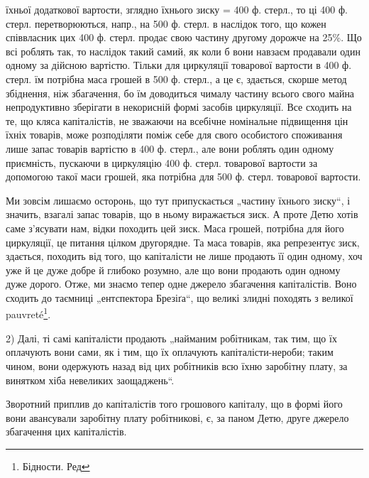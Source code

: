\parcont{}  %
їхньої додаткової вартости, зглядно їхнього зиску = 400 ф. стерл., то
ці 400 ф. стерл. перетворюються, напр., на 500 ф. стерл. в наслідок
того, що кожен співвласник цих 400 ф. стерл. продає свою частину другому
дорожче на 25\%. Що всі роблять так, то наслідок такий самий,
як коли б вони навзаєм продавали один одному за дійсною вартістю.
Тільки для циркуляції товарової вартости в 400 ф. стерл. їм потрібна
маса грошей в 500 ф. стерл., а це є, здається, скорше метод збіднення,
ніж збагачення, бо їм доводиться чималу частину всього свого майна
непродуктивно зберігати в некорисній формі засобів циркуляції. Все
сходить на те, що кляса капіталістів, не зважаючи на всебічне номінальне
підвищення цін їхніх товарів, може розподіляти поміж себе для свого
особистого споживання лише запас товарів вартістю в 400 ф.
стерл., але вони роблять один одному приємність, пускаючи в циркуляцію
400 ф. стерл. товарової вартости за допомогою такої маси грошей,
яка потрібна для 500 ф. стерл. товарової вартости.

Ми зовсім лишаємо осторонь, що тут припускається „частину їхнього
зиску“, і значить, взагалі запас товарів, що в ньому виражається зиск.
А проте Детю хотів саме з’ясувати нам, відки походить цей зиск. Маса
грошей, потрібна для його циркуляції, це питання цілком другорядне. Та маса
товарів, яка репрезентує зиск, здається, походить від того, що капіталісти
не лише продають її один одному, хоч уже й це дуже добре й
глибоко розумно, але що вони продають один одному дуже дорого.
Отже, ми знаємо тепер одне джерело збагачення капіталістів. Воно сходить
до таємниці „ентспектора Брезіґа“, що великі злидні походять з великої
pauvreté\footnote*{
Бідности. Ред
}.

2) Далі, ті самі капіталісти продають „найманим робітникам, так тим,
що їх оплачують вони сами, як і тим, що їх оплачують капіталісти-нероби;
таким чином, вони одержують назад від цих робітників всю їхню заробітну
плату, за винятком хіба невеликих заощаджень“.

Зворотний приплив до капіталістів того грошового капіталу, що
в формі його вони авансували заробітну плату робітникові, є, за паном
Детю, друге джерело збагачення цих капіталістів.

